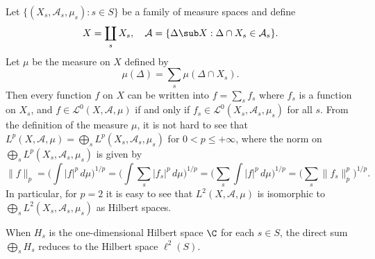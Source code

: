 \begin{example}\label{L^2 space disjoint union}
Let $\{(X_s,\mathcal{A}_s,\mu_s):s\in S\}$ be a family of measure spaces and define
\[X=\coprod_sX_s,\quad \mathcal{A}=\{\Delta\sub X:\Delta\cap X_s\in\mathcal{A}_s\}.\]
Let $\mu$ be the measure on $X$ defined by
\[\mu(\Delta)=\sum_s\mu(\Delta\cap X_s).\]
Then every function $f$ on $X$ can be written into $f=\sum_sf_s$ where $f_s$ is a function on $X_s$, and $f\in\mathcal{L}^0(X,\mathcal{A},\mu)$ if and only if $f_s\in\mathcal{L}^0(X_s,\mathcal{A}_s,\mu_s)$ for all $s$. From the definition of the measure $\mu$, it is not hard to see that $L^p(X,\mathcal{A},\mu)=\bigoplus_sL^p(X_s,\mathcal{A}_s,\mu_s)$ for $0<p\leq+\infty$, where the norm on $\bigoplus_sL^p(X_s,\mathcal{A}_s,\mu_s)$ is given by
\[\|f\|_p=\Big(\int |f|^p\,d\mu\Big)^{1/p}=\Big(\int \sum_s|f_s|^p\,d\mu\Big)^{1/p}=\Big(\sum_s\int |f|^p\,d\mu\Big)^{1/p}=\Big(\sum_s\|f_s\|_p^p\Big)^{1/p}.\]
In particular, for $p=2$ it is easy to see that $L^2(X,\mathcal{A},\mu)$ is isomorphic to $\bigoplus_sL^2(X_s,\mathcal{A}_s,\mu_s)$ as Hilbert spaces.
\end{example}
\begin{example}
When $H_s$ is the one-dimensional Hilbert space $\C$ for each $s\in S$, the direct sum $\bigoplus_sH_s$ reduces to the Hilbert space $\ell^2(S)$.
\end{example}
